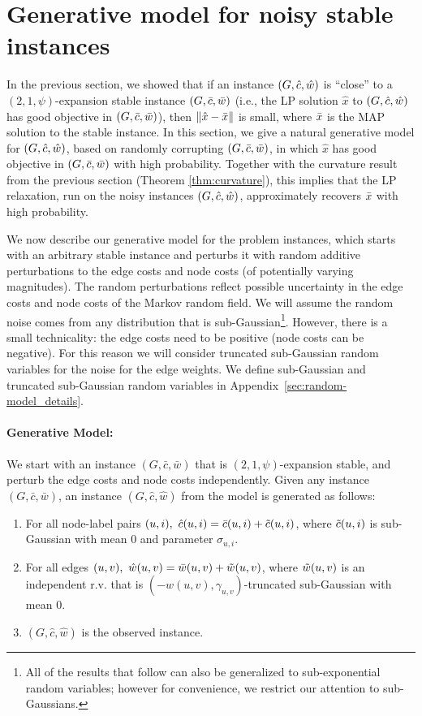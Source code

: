 \section{Generative model for noisy stable instances}\label{sec:random-model}
In the previous section, we showed that if an instance $(G, \hat{c}, \hat{w})$ is ``close'' to a $(2,1,\psi)$-expansion stable instance $(G,\bar{c}, \bar{w})$ (i.e., the LP solution $\hat{x}$ to $(G, \hat{c}, \hat{w})$ has good objective in  $(G,\bar{c}, \bar{w})$), then $\lVert \hat{x} - \bar{x} \rVert$ is small, where $\bar{x}$ is the MAP solution to the stable instance. In this section, we give a natural generative model for $(G, \hat{c}, \hat{w})$, based on randomly corrupting $(G,\bar{c},\bar{w})$, in which $\hat{x}$ has good objective in $(G,\bar{c},\bar{w})$ with high probability. Together with the curvature result from the previous section (Theorem \ref{thm:curvature}), this implies that the LP relaxation, run on the noisy instances $(G,\hat{c},\hat{w})$, approximately recovers $\bar{x}$ with high probability.



We now describe our generative model for the problem instances, which starts with an arbitrary stable instance and perturbs it with random additive perturbations to the edge costs and node costs (of potentially varying magnitudes). 
The random perturbations reflect possible uncertainty in the edge costs and node costs of the Markov random field.
We will assume the random noise comes from any distribution that is sub-Gaussian\footnote{All of the results that follow can also be generalized to sub-exponential random variables; however for convenience, we restrict our attention to sub-Gaussians.}. However, there is a small technicality: the edge costs need to be positive (node costs can be negative). For this reason we will consider truncated sub-Gaussian random variables for the noise for the edge weights. We define sub-Gaussian and truncated sub-Gaussian random variables in Appendix~\ref{sec:random-model_details}.

\paragraph{Generative Model:}
We start with an instance $(G,\bar{c},\bar{w})$ that is $(2, 1, \psi)$-expansion stable, and perturb the edge costs and node costs independently. Given any instance $(G,\bar{c},\bar{w})$, an instance $(G,\hat{c},\hat{w})$ from the model is generated as follows:

\begin{enumerate}
    \item For all node-label pairs $(u,i),\ \hat{c}(u,i) = \bar{c}(u,i) + \tc(u,i)$, where $\tilde{c}(u,i)$ is sub-Gaussian with mean $0$ and parameter $\sigma_{u,i}$.
    \item For all edges $(u,v),\ \hat{w}(u,v) = \bar{w}(u,v) + \tilde{w}(u,v)$, where $\tilde{w}(u,v)$ is an independent r.v. that is $(-w(u,v),\gamma_{u,v})$-truncated sub-Gaussian with mean $0$.
    \item $(G, \hat{c}, \hat{w})$ is the observed instance.
\end{enumerate}


